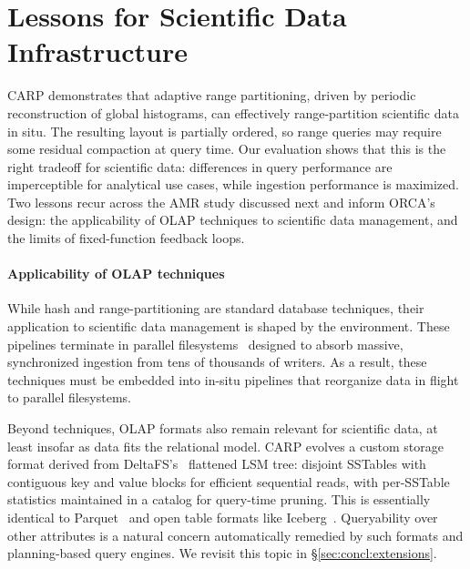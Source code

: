 \section{Lessons for Scientific Data Infrastructure}
\label{sec:carp:lessons}

CARP demonstrates that adaptive range partitioning, driven by periodic reconstruction of global
histograms, can effectively range-partition scientific data in situ.
The resulting layout is
partially ordered, so range queries may require some residual compaction at query time.
Our
evaluation shows that this is the right tradeoff for scientific data: differences in query
performance are
imperceptible for analytical use cases, while ingestion performance is maximized.
Two lessons recur across the AMR study discussed next and inform ORCA’s design: the
applicability of OLAP techniques to scientific data management, and the limits of
fixed-function feedback loops.

\enlargethispage{\baselineskip}
\paragraph{Applicability of OLAP techniques} While hash and range-partitioning are standard
database
techniques, their application to scientific data management is shaped by the environment.
These pipelines terminate in parallel filesystems~\cite{Braam2002:Lustre,Oeste2025:StorageGaps} designed to absorb
massive,
synchronized ingestion from tens of thousands of writers.
As a result, these techniques must be embedded into in-situ pipelines
that reorganize data in flight to parallel filesystems.

Beyond techniques, OLAP formats also remain relevant for scientific data, at least insofar as
data fits the relational model.
CARP evolves a custom storage format derived from DeltaFS's~\cite{Zheng2018:DeltaFS}
flattened LSM tree: disjoint SSTables with contiguous key and value blocks for efficient sequential
reads,
with per-SSTable statistics maintained in a catalog for query-time pruning.
This is essentially identical to Parquet~\cite{:ApacheParquet} and open table formats like
Iceberg~\cite{:Iceberg}.
Queryability over other attributes is a natural concern automatically remedied by such
formats
and planning-based query engines.
We revisit this topic in \S\ref{sec:concl:extensions}.

